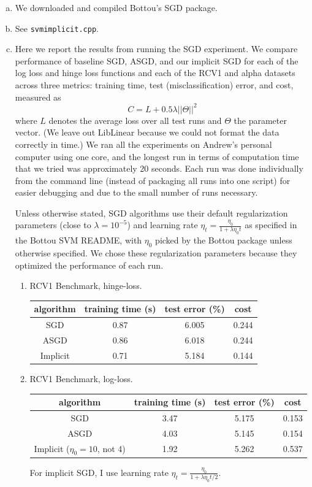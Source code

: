 \documentclass{article}
\begin{document}
\begin{enumerate}[(a)]
\item We downloaded and compiled Bottou's SGD package.
\item See \texttt{svmimplicit.cpp}.
\item Here we report the results from running the SGD experiment. We compare performance of baseline SGD, ASGD, and our implicit SGD for each of the log loss and hinge loss functions and each of the RCV1 and alpha datasets across three metrics: training time, test (misclassification) error, and cost, measured as  $$C = L + 0.5 \lambda ||\Theta||^2$$ where $L$ denotes the average loss over all test runs and $\Theta$ the parameter vector. (We leave out LibLinear because we could not format the data correctly in time.) We ran all the experiments on Andrew's personal computer using one core, and the longest run in terms of computation time that we tried was approximately 20 seconds. Each run was done individually from the command line (instead of packaging all runs into one script) for easier debugging and due to the small number of runs necessary.

Unless otherwise stated, SGD algorithms use their default regularization parameters (close to $\lambda = 10^{-5}$) and learning rate $\eta_t = \frac{\eta_0}{1+ \lambda\eta_0 t}$ as specified in the Bottou SVM README, with $\eta_0$ picked by the Bottou package unless otherwise specified. We chose these regularization parameters because they optimized the performance of each run.

\begin{enumerate}[1.]
\item RCV1 Benchmark, hinge-loss.
\begin{center}
\begin{tabular}{ c | c | c | c }
  algorithm & training time (s) & test error (\%) & cost \\ \hline                       
  SGD & 0.87 &  6.005 & 0.244\\
  ASGD & 0.86 & 6.018 & 0.244\\
  Implicit & 0.71 & 5.184 & 0.144\\
\end{tabular}
\end{center}

\item RCV1 Benchmark, log-loss.
\begin{center}
\begin{tabular}{ c | c | c | c }
  algorithm & training time (s) & test error (\%) & cost \\ \hline                       
  SGD & 3.47 &  5.175 & 0.153\\
  ASGD & 4.03 & 5.145 & 0.154\\
  Implicit ($\eta_0=10$, not 4) & 1.92 & 5.262 & 0.537\\
\end{tabular}
\end{center}
For implicit SGD, I use learning rate $\eta_t = \frac{\eta_0}{1+ \lambda\eta_0 t/2}$.


\end{enumerate}
\end{enumerate}
\end{document}
